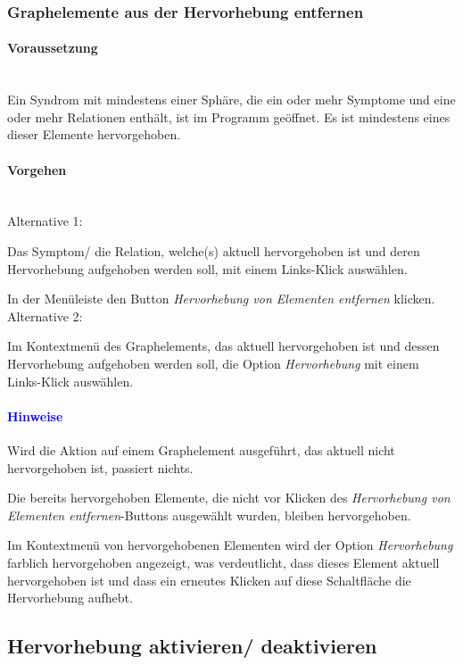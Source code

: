 \documentclass[enabledeprecatedfontcommands,fontsize=11pt,paper=a4,twoside]{scrartcl}
\newcounter{one}
\newcounter{two}[one]
\newcommand*{\hint}{\paragraph{\textcolor{blue}{Hinweise}}}
\newcommand*{\condition}{\paragraph{Voraussetzung}$\;$ \vspace{0.2cm}\\}
\newcommand*{\actions}{\paragraph{Vorgehen} $\;$\vspace{0.2cm}\\}
\newcommand*{\aOne}{\textcolor{bbe}{Alternative 1:}}
\newcommand*{\aTwo}{\textcolor{bbe}{Alternative 2:}}
\let\tempone\itemize
\let\temptwo\enditemize
\renewenvironment{itemize}{\tempone\addtolength{\itemsep}{-10.0pt}}{\temptwo}
\let\origenumerate\enumerate
\let\origendenumerate\endenumerate
\renewenvironment{enumerate}{\origenumerate \addtolength{\itemsep}{-10.0pt}}{\origendenumerate}
\begin{document}
\subsubsection{Graphelemente aus der Hervorhebung entfernen}
		\condition 	
		Ein Syndrom mit mindestens einer Sphäre, die ein oder mehr Symptome und eine oder mehr Relationen enthält, ist im Programm geöffnet. Es ist mindestens eines dieser Elemente hervorgehoben.
		\actions
		\aOne
		\begin{enumerate}
			\item Das Symptom/ die Relation, welche(s) aktuell hervorgehoben ist und deren Hervorhebung aufgehoben werden soll, mit einem Links-Klick auswählen. 
			\item In der Menüleiste den Button \textit{Hervorhebung von Elementen entfernen} klicken.
		\end{enumerate}
		\aTwo
		\begin{enumerate}
			\item Im Kontextmenü des Graphelements, das aktuell hervorgehoben ist und dessen Hervorhebung aufgehoben werden soll, die Option \textit{Hervorhebung} mit einem Links-Klick auswählen.
		\end{enumerate}
		\hint
		\begin{itemize}
			\item Wird die Aktion auf einem Graphelement ausgeführt, das aktuell nicht hervorgehoben ist, passiert nichts.
			\item Die bereits hervorgehoben Elemente, die nicht vor Klicken des \textit{Hervorhebung von Elementen entfernen}-Buttons ausgewählt wurden, bleiben hervorgehoben.
			\item Im Kontextmenü von hervorgehobenen Elementen wird der Option \textit{Hervorhebung}  farblich hervorgehoben angezeigt, was verdeutlicht, dass dieses Element aktuell hervorgehoben ist und dass ein erneutes Klicken auf diese Schaltfläche die Hervorhebung aufhebt. \\
		\end{itemize}
	
\subsection{Hervorhebung aktivieren/ deaktivieren}
\end{document}
